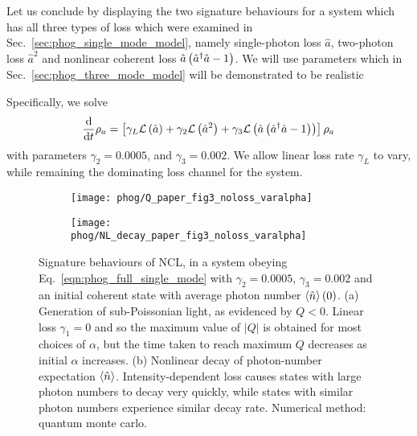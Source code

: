 Let us conclude by displaying the two signature behaviours for a system which has all three types of loss which were examined in Sec.~\ref{sec:phog_single_mode_model}, namely single-photon loss $\hat{a}$, two-photon loss $\hat{a}^2$ and nonlinear coherent loss $\hat{a}\left(\hat{a}^\dagger \hat{a} - 1\right)$. We will use parameters which in Sec.~\ref{sec:phog_three_mode_model} will be demonstrated to be realistic

Specifically, we solve
\begin{equation}\label{eqn:phog_full_single_mode}
\frac{\mathrm{d}}{\mathrm{d}t} \rho_a = \left[\gamma_L \mathcal{L}\left(\hat{a}\right) + \gamma_2 \mathcal{L}\left(\hat{a}^2\right) + \gamma_3 \mathcal{L}\left(\hat{a}\left(\hat{a}^\dagger \hat{a} - 1\right)\right) \right] \rho_a
\end{equation}
with parameters $\gamma_2 = 0.0005$, and $\gamma_3 = 0.002$. We allow linear loss rate $\gamma_L$ to vary, while remaining the dominating loss channel for the system.

\begin{figure}[htp]
\centering
	\begin{subfigure}{0.49\linewidth}
	\centering
	\caption{}
	\texttt{[image: phog/Q\_paper\_fig3\_noloss\_varalpha]}
	\end{subfigure}
	\begin{subfigure}{0.49\linewidth}
	\centering
	\caption{}
	\texttt{[image: phog/NL\_decay\_paper\_fig3\_noloss\_varalpha]}
	\end{subfigure}
\caption{\label{fig:phog_fig3paper} Signature behaviours of NCL, in a system obeying Eq.~\ref{eqn:phog_full_single_mode} with $\gamma_2 = 0.0005$, $\gamma_3 = 0.002$ and an initial coherent state with average photon number $\ev{\hat{n}}\left(0\right)$. (a) Generation of sub-Poissonian light, as evidenced by $Q<0$. Linear loss $\gamma_1=0$ and so the maximum value of $\left|Q\right|$ is obtained for most choices of $\alpha$, but the time taken to reach maximum $Q$ decreases as initial $\alpha$ increases. (b) Nonlinear decay of photon-number expectation $\ev{\hat{n}}$. Intensity-dependent loss causes states with large photon numbers to decay very quickly, while states with similar photon numbers experience similar decay rate. Numerical method: quantum monte carlo.}
\end{figure}

